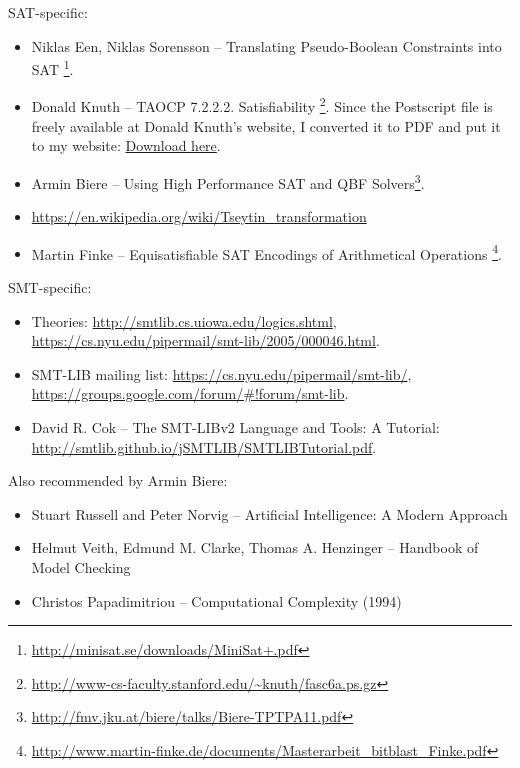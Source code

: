 SAT-specific:

\begin{itemize}

\item Niklas Een, Niklas Sorensson -- Translating Pseudo-Boolean Constraints into SAT
\footnote{\url{http://minisat.se/downloads/MiniSat+.pdf}}.

\item Donald Knuth -- \ac{TAOCP} 7.2.2.2. Satisfiability
\footnote{\url{http://www-cs-faculty.stanford.edu/~knuth/fasc6a.ps.gz}}.
Since the Postscript file is freely available at Donald Knuth's website, I converted it to PDF and put it to my website:
\href{https://yurichev.com/mirrors/Donald%20Knuth/TAOCP%206a%207.2.2.2%20(SAT)/fasc6a.pdf}{Download here}.

\item Armin Biere -- Using High Performance SAT and QBF Solvers\footnote{\url{http://fmv.jku.at/biere/talks/Biere-TPTPA11.pdf}}.

\item \url{https://en.wikipedia.org/wiki/Tseytin_transformation}

\item Martin Finke -- Equisatisfiable SAT Encodings of Arithmetical Operations
\footnote{\url{http://www.martin-finke.de/documents/Masterarbeit_bitblast_Finke.pdf}}.

\end{itemize}

SMT-specific:

\begin{itemize}
\item Theories: \url{http://smtlib.cs.uiowa.edu/logics.shtml}, \url{https://cs.nyu.edu/pipermail/smt-lib/2005/000046.html}.

\item SMT-LIB mailing list: \url{https://cs.nyu.edu/pipermail/smt-lib/}, \url{https://groups.google.com/forum/#!forum/smt-lib}.

\item David R. Cok -- The SMT-LIBv2 Language and Tools: A Tutorial: \url{http://smtlib.github.io/jSMTLIB/SMTLIBTutorial.pdf}.

\end{itemize}

Also recommended by Armin Biere:

\begin{itemize}
\item Stuart Russell and Peter Norvig -- Artificial Intelligence: A Modern Approach

\item Helmut Veith, Edmund M. Clarke, Thomas A. Henzinger -- Handbook of Model Checking

\item Christos Papadimitriou -- Computational Complexity (1994)
\end{itemize}

